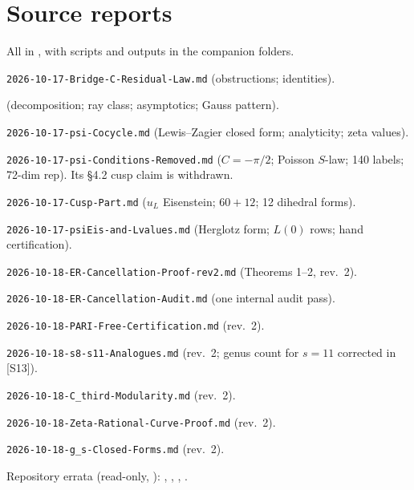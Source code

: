 \documentclass[11pt]{article}
\theoremstyle{definition}
\begin{document}
\section*{Source reports}\label{sec:sources}
All in , with scripts and outputs in the companion folders.
\begin{enumerate}[label={[S\arabic*]},leftmargin=3em]
\item \texttt{2026-10-17-Bridge-C-Residual-Law.md} (obstructions; identities).
\item {} (decomposition; ray class; asymptotics; Gauss pattern).
\item \texttt{2026-10-17-psi-Cocycle.md} (Lewis--Zagier closed form; analyticity; zeta values).
\item \texttt{2026-10-17-psi-Conditions-Removed.md} ($C=-\pi/2$; Poisson $S$-law; 140 labels; 72-dim rep). Its \S4.2 cusp claim is withdrawn.
\item \texttt{2026-10-17-Cusp-Part.md} ($u_L$ Eisenstein; $60+12$; 12 dihedral forms).
\item \texttt{2026-10-17-psiEis-and-Lvalues.md} (Herglotz form; $L(0)$ rows; hand certification).
\item \texttt{2026-10-18-ER-Cancellation-Proof-rev2.md} (Theorems 1--2, rev.~2).
\item \texttt{2026-10-18-ER-Cancellation-Audit.md} (one internal audit pass).
\item \texttt{2026-10-18-PARI-Free-Certification.md} (rev.~2).
\item \texttt{2026-10-18-s8-s11-Analogues.md} (rev.~2; genus count for $s=11$ corrected in [S13]).
\item \texttt{2026-10-18-C\_third-Modularity.md} (rev.~2).
\item \texttt{2026-10-18-Zeta-Rational-Curve-Proof.md} (rev.~2).
\item \texttt{2026-10-18-g\_s-Closed-Forms.md} (rev.~2).
\end{enumerate}
Repository errata (read-only, ): ,
, ,
.
\end{document}
